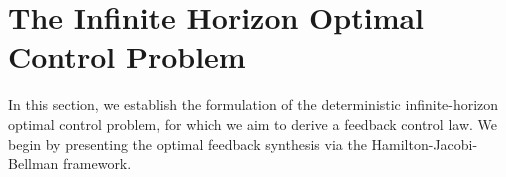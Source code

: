 \documentclass{article}
\begin{document}

\section{The Infinite Horizon Optimal Control Problem}\label{sec:iocp}
In this section, we establish the formulation of the deterministic infinite-horizon optimal control problem, for which we aim to derive a feedback control law. We begin by presenting the optimal feedback synthesis via the Hamilton-Jacobi-Bellman framework.  
\end{document}
